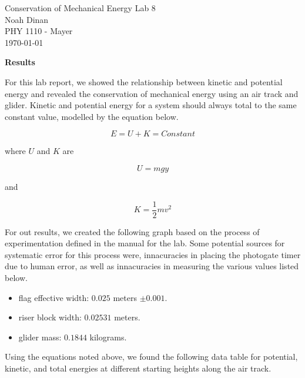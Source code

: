 \documentclass[12pt]{article}
\begin{document}
\begin{center}
\vspace*{\fill}
Conservation of Mechanical Energy Lab 8 \\ Noah Dinan \\ PHY 1110 - Mayer \\ \today \\
\vspace*{\fill}
\end{center}

\newpage
{} %

\setlength{\parindent}{0in}

\textbf{Results}

For this lab report, we showed the relationship between kinetic and potential
energy and revealed the conservation of mechanical energy using an air track and 
glider. Kinetic and potential energy for a system should always total to the same
constant value, modelled by the equation below.

\[ E = U + K = Constant \]

where $U$ and $K$ are

\[ U = mgy \]

and

\[ K = \frac{1}{2} mv^2 \]


For out results, we created the following graph based on the process of
experimentation defined in the manual for the lab.
Some potential sources for systematic error for this process were, innacuracies
in placing the photogate timer due to human error, as well as innacuracies in 
measuring the various values listed below.

\begin{itemize}
    \item flag effective width: $0.025$ meters $\pm0.001$.
    \item riser block width: $0.02531$ meters.
    \item glider mass: $0.1844$ kilograms.
\end{itemize}

Using the equations noted above, we found the following data table for potential, kinetic, and total
energies at different starting heights along the air track.
\end{document}
